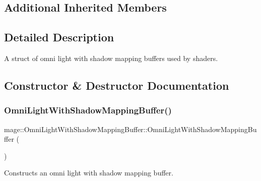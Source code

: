 \subsection*{Additional Inherited Members}


\subsection{Detailed Description}
A struct of omni light with shadow mapping buffers used by shaders. 

\subsection{Constructor \& Destructor Documentation}
\hypertarget{structmage_1_1_omni_light_with_shadow_mapping_buffer_a02ade96988185cc3b0f24f4618534935}{}\label{structmage_1_1_omni_light_with_shadow_mapping_buffer_a02ade96988185cc3b0f24f4618534935} 
\subsubsection{\texorpdfstring{Omni\+Light\+With\+Shadow\+Mapping\+Buffer()}{OmniLightWithShadowMappingBuffer()}\hspace{0.1cm}{\footnotesize\ttfamily [1/3]}}
{\footnotesize\ttfamily mage\+::\+Omni\+Light\+With\+Shadow\+Mapping\+Buffer\+::\+Omni\+Light\+With\+Shadow\+Mapping\+Buffer (\begin{DoxyParamCaption}{ }\end{DoxyParamCaption})}

Constructs an omni light with shadow mapping buffer. \hypertarget{structmage_1_1_omni_light_with_shadow_mapping_buffer_a6aabe633e5b81842a7686561c8af30fc}{}\label{structmage_1_1_omni_light_with_shadow_mapping_buffer_a6aabe633e5b81842a7686561c8af30fc} 
